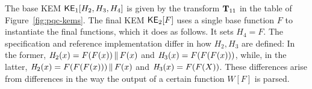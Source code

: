 %

 The base KEM ${\mathsf{KE}}_1[H_2,H_3,H_4]$ is given by the transform $\mathbf{T}_{11}$ in the table of Figure~\ref{fig:pqc-kems}. The final KEM ${\mathsf{KE}}_2[F]$ uses a single base function $F$ to instantiate the final functions, which it does as follows. It sets $H_4=F$. The specification and reference implementation differ in how $H_2,H_3$ are defined: In the former, $\mathit{H}_2(x) = F(F(x)){\,\|\,} F(x)$ and $\mathit{H}_3(x) = F(F(F(x)))$, while, in the latter, $\mathit{H}_2(x) = F(F(F(x))) {\,\|\,} F(x)$ and $\mathit{H}_3(x) = F(F(X))$. These differences arise from differences in the way the output of a certain function $W[F]$ is parsed.



